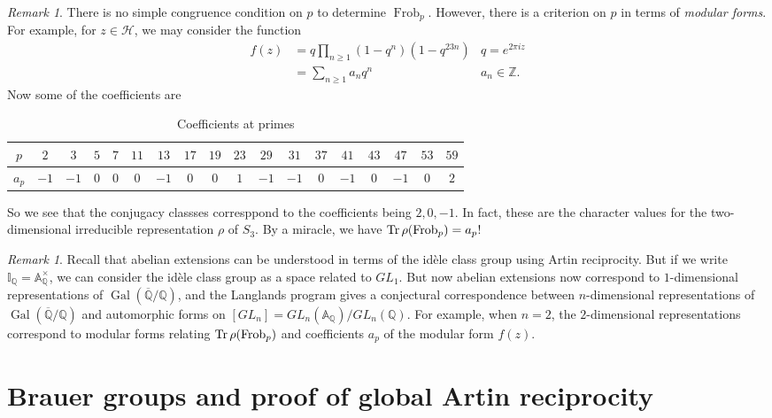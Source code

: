 \documentclass[leqno, openany]{memoir}
\theoremstyle{definition}
\theoremstyle{remark}
\newtheorem{rmk}[thm]{Remark}
\theoremstyle{plain}
\theoremstyle{definition}
\theoremstyle{remark}
\newcommand{\A}{\mathbb{A}}
\newcommand{\Z}{\mathbb{Z}}
\newcommand{\Q}{\mathbb{Q}}
\newcommand{\I}{\mathbb{I}}
\newcommand{\mc}[1]{\mathcal{#1}}
\newcommand{\ol}[1]{\overline{#1}}
\DeclareMathOperator{\Gal}{Gal}
\DeclareMathOperator{\Frob}{Frob}
\begin{document}
\begin{rmk}
    There is no simple congruence condition on $p$ to determine $\Frob_p$. However, there is a criterion on $p$ in terms of \textit{modular forms}. For example, for $z \in \mc{H}$, we may consider the function
    \begin{align*}
        f(z) &= q \prod_{n \geq 1} (1-q^n) (1-q^{23 n}) &q = e^{2 \pi i z} \\
             &= \sum_{n \geq 1} a_n q^n &a_n \in \Z.
    \end{align*}
    Now some of the coefficients are
    \begin{table}[H]
        \centering
        \caption{Coefficients at primes}
        \label{tab:coefficients-at-primes}
        \begin{tabular}{cccccccccccccccccc}
            \toprule
            $p$ & $2$ & $3$ & $5$ & $7$ & $11$ & $13$ & $17$ & $19$ & $23$ & $29$ & $31$ & $37$ & $41$ & $43$ & $47$ & $53$ & $59$ \\
            \midrule
            $a_p$ & $-1$ & $-1$ & $0$ & $0$ & $0$ & $-1$ & $0$ & $0$ & $1$ & $-1$ & $-1$ & $0$ & $-1$ & $0$ & $-1$ & $0$ & $2$ \\
            \bottomrule
        \end{tabular}
    \end{table}
    So we see that the conjugacy classses corresppond to the coefficients being $2, 0, -1$. In fact, these are the character values for the two-dimensional irreducible representation $\rho$ of $S_3$. By a miracle, we have $\Tr \rho(\Frob_p) = a_p$!
\end{rmk}

\begin{rmk}
    Recall that abelian extensions can be understood in terms of the id\`ele class group using Artin reciprocity. But if we write $\I_{\Q} = \A_{\Q}^{\times}$, we can consider the id\`ele class group as a space related to $GL_1$. But now abelian extensions now correspond to $1$-dimensional representations of $\Gal(\ol{\Q}/\Q)$, and the Langlands program gives a conjectural correspondence between $n$-dimensional representations of $\Gal(\ol{\Q}/\Q)$ and automorphic forms on $[GL_n] = GL_n(\A_{\Q}) / GL_n(\Q)$. For example, when $n=2$, the $2$-dimensional representations correspond to modular forms relating $\Tr \rho(\Frob_p)$ and coefficients $a_p$ of the modular form $f(z)$.
\end{rmk}

\section{Brauer groups and proof of global Artin reciprocity}%
\label{sec:brauer_groups_and_proof_of_artin_reciprocity}
\end{document}
